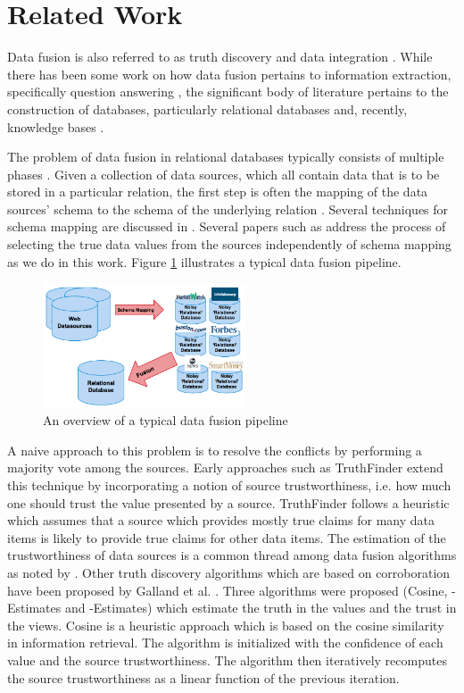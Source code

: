 \documentclass{acm_proc_article-sp}
\begin{document}
\section{Related Work}
Data fusion is also referred to as truth discovery \cite{waguih:truth} \cite{yin:truth} and data integration \cite{sarma:data} \cite{zhao:bayesian}. While there has been some work on how data fusion pertains to information extraction, specifically question answering \cite{wu:corroborating}, the significant body of literature pertains to the construction of databases, particularly relational databases and, recently, knowledge bases \cite{dong:data}. 



The problem of data fusion in relational databases typically consists of multiple phases \cite{bleiholder:data} \cite{li:truth}. Given a collection of data sources, which all contain data that is to be stored in a particular relation, the first step is often the mapping of the data sources' schema to the schema of the underlying relation \cite{bleiholder:data}. Several techniques for schema mapping are discussed in \cite{naumann:data}. Several papers such as \cite{li:truth} address the process of selecting the true data values from the sources independently of schema mapping as we do in this work. Figure \ref{fig:overview} illustrates a typical  data fusion pipeline. 

\begin{figure}
\centering
\includegraphics[width=6cm]{Overview.png}
\caption{An overview of a typical data fusion pipeline}
\label{fig:overview}
\end{figure}


A naive approach to this problem is to resolve the conflicts by performing a majority vote among the sources. Early approaches such as {\sc TruthFinder} \cite{yin:truth} extend this technique by incorporating a notion of source trustworthiness, i.e. how much one should trust the value presented by a source. {\sc TruthFinder} follows a heuristic which assumes that a source which provides mostly true claims for many data items is likely to provide true claims for other data items. The estimation of the trustworthiness of data sources   is a common thread among data fusion algorithms as noted by \cite{li:truth} \cite{waguih:truth}. Other truth discovery algorithms which are based on corroboration have been proposed by Galland et al. \cite{galland:corro}. Three algorithms were proposed ({\sc Cosine}, {-Estimates} and {-Estimates}) which estimate the truth in the values and the trust in the views. {\sc Cosine} is a heuristic approach which is based on the cosine similarity in information retrieval. The algorithm is initialized with the confidence of each value and the source trustworthiness. The algorithm then iteratively recomputes the source trustworthiness as a linear function of the previous iteration. 
\end{document}
